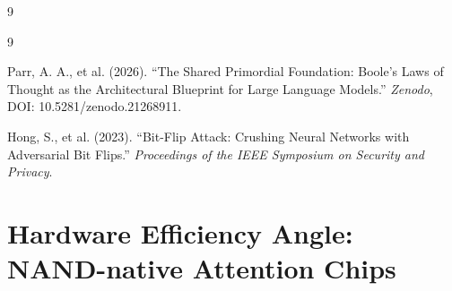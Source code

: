 \documentclass[11pt]{article}
\theoremstyle{definition}
\begin{document}
\begin{thebibliography}{9}
\begin{thebibliography}{9}






Parr, A. A., et al. (2026). ``The Shared Primordial Foundation: Boole's Laws of Thought as the Architectural Blueprint for Large Language Models.'' \emph{Zenodo}, DOI: 10.5281/zenodo.21268911.



















Hong, S., et al. (2023). ``Bit-Flip Attack: Crushing Neural Networks with Adversarial Bit Flips.'' \emph{Proceedings of the IEEE Symposium on Security and Privacy}.






\end{thebibliography}







































\section{Hardware Efficiency Angle: NAND-native Attention Chips}







\end{thebibliography}
\end{document}
